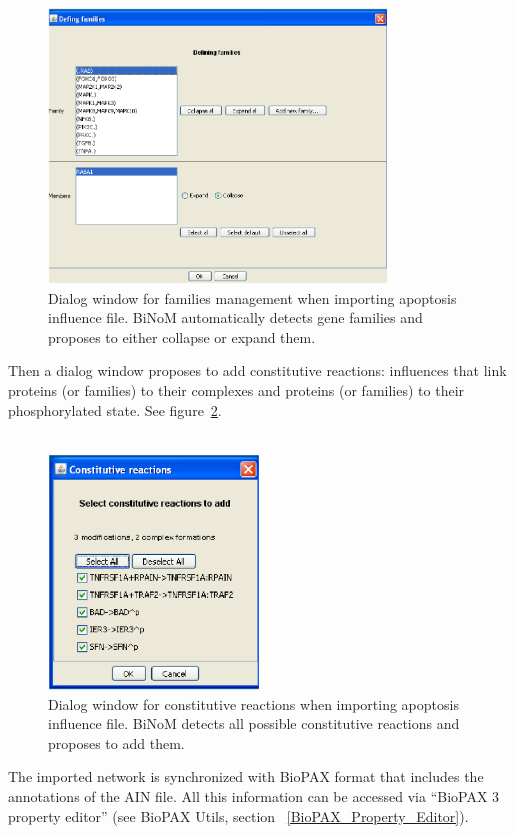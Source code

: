 \begin{figure}
\centering
\includegraphics[width=0.8\textwidth]{graphics/AIN_dialog_for_families_management}
\caption{Dialog window for families management when importing apoptosis influence file. BiNoM automatically detects gene families and proposes to either collapse or expand them.}
\label{AIN_dialog_for_families_management}
\end{figure}

Then a dialog window proposes to add constitutive reactions: influences that
link proteins (or families) to their complexes and proteins (or families) to
their phosphorylated state. See
figure~\ref{AIN_dialog_for_constitutive_reactions}.\\\\

\begin{figure}
\centering
\includegraphics[width=0.5\textwidth]{graphics/AIN_dialog_for_constitutive_reactions}
\caption{Dialog window for constitutive reactions when importing apoptosis influence file. BiNoM detects all possible constitutive reactions and proposes to add them.}
\label{AIN_dialog_for_constitutive_reactions}
\end{figure}
The imported network is synchronized with BioPAX format that includes the annotations of the AIN file. All this information can be accessed via “BioPAX 3 property editor” (see BioPAX Utils, section ~\ref{BioPAX_Property_Editor}).

